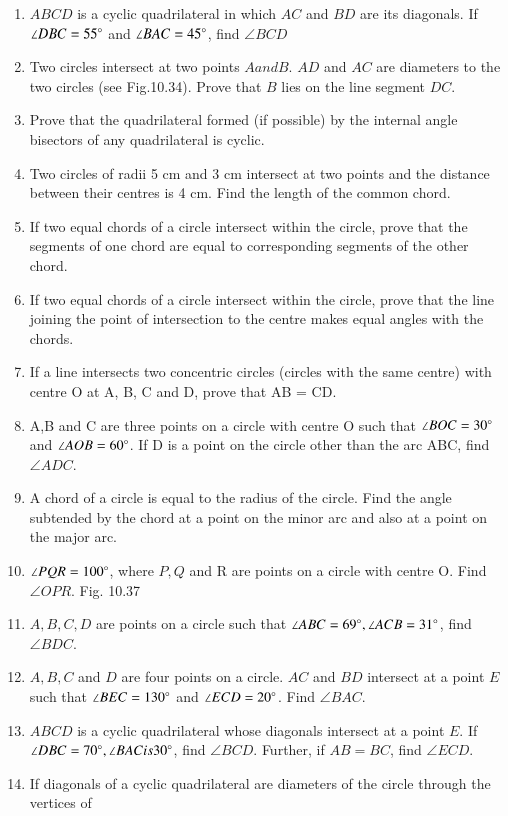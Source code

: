 \begin{enumerate}[label=\arabic*.,ref=\thesubsection.\theenumi]
\item $ABCD$ is a cyclic quadrilateral in which $AC$ and $BD$ are its diagonals. If $\angle DBC = 55\degree$ and $\angle BAC = 45\degree$, find $\angle BCD$
\item Two circles intersect at two points $A and B$. $AD$ and $AC$ are diameters to the two circles (see Fig.10.34). Prove that $B$ lies on the line segment $DC$.
\item Prove that the quadrilateral formed (if possible) by the internal angle bisectors of any quadrilateral is cyclic.
\item Two circles of radii 5 cm and 3 cm intersect at two points and the distance between their centres is 4 cm. Find the length of the common chord.
\item  If two equal chords of a circle intersect within the circle, prove that the segments of one chord are equal to corresponding segments of the other chord.
\item If two equal chords of a circle intersect within the circle, prove that the line joining the point of intersection to the centre makes equal angles with the chords.
\item If a line intersects two concentric circles (circles with the same centre) with centre O at A, B, C and D, prove that AB = CD.
%
\item  A,B and C are three points on a circle with centre O such that $\angle BOC = 30\degree $ and $ \angle AOB = 60\degree$. If D is a point on the circle other than the arc ABC, find $\angle ADC$.
\item A chord of a circle is equal to the radius of the
circle. Find the angle subtended by the chord at
a point on the minor arc and also at a point on the
major arc.
\item $ \angle PQR = 100\degree$, where $P, Q$ and R are
points on a circle with centre O. Find $\angle OPR$.
Fig. 10.37
\item $A, B, C, D$ are points on a circle such that $ \angle ABC = 69\degree, \angle ACB = 31\degree$, find
$\angle BDC$.
\item $A, B, C$ and $D$ are four points on a
circle. $AC$ and $BD$ intersect at a point $E$ such
that $\angle BEC = 130\degree$ and $\angle ECD = 20\degree$. Find $\angle BAC$.
\item $ABCD$ is a cyclic quadrilateral whose diagonals intersect at a point $E$. If $\angle DBC = 70\degree,
\angle BAC is 30\degree$, find $\angle BCD$. Further, if $AB = BC$, find $\angle ECD$.
\item If diagonals of a cyclic quadrilateral are diameters of the circle through the vertices of

\end{enumerate}
